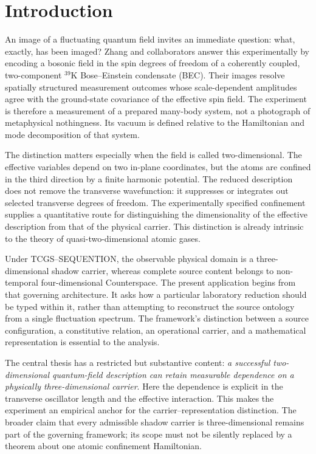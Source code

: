 \documentclass[11pt,a4paper]{article}
\theoremstyle{definition}
\theoremstyle{remark}
\newcommand{\TCGS}{TCGS--SEQUENTION}
\begin{document}
\section{Introduction}
\label{sec:intro}
An image of a fluctuating quantum field invites an immediate question: what, exactly, has been imaged? Zhang and collaborators answer this experimentally by encoding a bosonic field in the spin degrees of freedom of a coherently coupled, two-component $^{39}\mathrm K$ Bose--Einstein condensate (BEC). Their images resolve spatially structured measurement outcomes whose scale-dependent amplitudes agree with the ground-state covariance of the effective spin field. The experiment is therefore a measurement of a prepared many-body system, not a photograph of metaphysical nothingness. Its vacuum is defined relative to the Hamiltonian and mode decomposition of that system.\cite{zhang2026}

The distinction matters especially when the field is called two-dimensional. The effective variables depend on two in-plane coordinates, but the atoms are confined in the third direction by a finite harmonic potential. The reduced description does not remove the transverse wavefunction: it suppresses or integrates out selected transverse degrees of freedom. The experimentally specified confinement supplies a quantitative route for distinguishing the dimensionality of the effective description from that of the physical carrier. This distinction is already intrinsic to the theory of quasi-two-dimensional atomic gases.\cite{zhang2026,hadzibabic,petrov}

Under \TCGS, the observable physical domain is a three-dimensional shadow carrier, whereas complete source content belongs to non-temporal four-dimensional Counterspace. The present application begins from that governing architecture. It asks how a particular laboratory reduction should be typed within it, rather than attempting to reconstruct the source ontology from a single fluctuation spectrum. The framework's distinction between a source configuration, a constitutive relation, an operational carrier, and a mathematical representation is essential to the analysis.\cite{foundation,logical}

The central thesis has a restricted but substantive content: \emph{a successful two-dimensional quantum-field description can retain measurable dependence on a physically three-dimensional carrier}. Here the dependence is explicit in the transverse oscillator length and the effective interaction. This makes the experiment an empirical anchor for the carrier--representation distinction. The broader claim that every admissible shadow carrier is three-dimensional remains part of the governing framework; its scope must not be silently replaced by a theorem about one atomic confinement Hamiltonian.\cite{foundation,planck}
\end{document}
